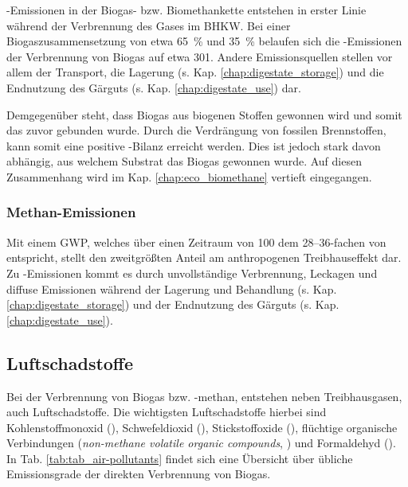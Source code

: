 -Emissionen in der Biogas- bzw. Biomethankette entstehen in erster Linie während der Verbrennung des Gases im \gls{BHKW}. Bei einer Biogaszusammensetzung von etwa \SI{65}{\percent}  und \SI{35}{\percent}  belaufen sich die -Emissionen der Verbrennung von Biogas auf etwa \SI[per-mode=symbol]{301}{\gcoeqkwh}. Andere Emissionsquellen stellen vor allem der Transport, die Lagerung (s. Kap. \ref{chap:digestate_storage}) und die Endnutzung des Gärguts (s. Kap. \ref{chap:digestate_use}) dar. \parencite{Paolini2018} \parencite{Nielsen2014} \smallskip

Demgegenüber steht, dass Biogas aus biogenen Stoffen gewonnen wird und somit das  zuvor gebunden wurde. Durch die Verdrängung von fossilen Brennstoffen, kann somit eine positive -Bilanz erreicht werden. Dies ist jedoch stark davon abhängig, aus welchem Substrat das Biogas gewonnen wurde. Auf diesen Zusammenhang wird im Kap. \ref{chap:eco_biomethane} vertieft eingegangen.


\subsubsection{Methan-Emissionen}

Mit einem \gls{GWP}, welches über einen Zeitraum von \SI{100}{\Jahren} dem \SIrange{28}{36}{\relax}-fachen von  entspricht, stellt  den zweitgrößten Anteil am anthropogenen Treibhauseffekt dar. Zu -Emissionen kommt es durch unvollständige Verbrennung, Leckagen und diffuse Emissionen während der Lagerung und Behandlung (s. Kap. \ref{chap:digestate_storage}) und der Endnutzung des Gärguts (s. Kap. \ref{chap:digestate_use}). \parencite{Paolini2018}


\subsection{Luftschadstoffe}

Bei der Verbrennung von Biogas bzw. -methan, entstehen neben Treibhausgasen, auch Luftschadstoffe. Die wichtigsten Luftschadstoffe hierbei sind Kohlenstoffmonoxid (), Schwefeldioxid (), Stickstoffoxide (), flüchtige organische Verbindungen (\textit{non-methane volatile organic compounds}, ) und Formaldehyd (). In Tab. \ref{tab:tab_air-pollutants} findet sich eine Übersicht über übliche Emissionsgrade der direkten Verbrennung von Biogas.



